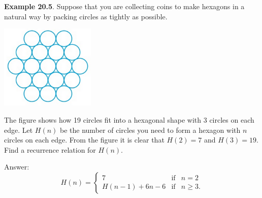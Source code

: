 \documentclass[aspectratio=169]{beamer}
\begin{document}
 
\begin{frame}[plain]{}

  {\bf Example 20.5}. 
  Suppose that you are collecting coins to make hexagons in a natural way
    by packing circles as tightly as possible.
    \begin{center}
     \includegraphics[height=4cm]{./img/lecture20-fig3.png}
    \end{center}
    The figure shows how 19 circles fit into a hexagonal shape with 3 circles
      on each edge. Let $H(n)$ be the number of circles you need to form a hexagon with
      $n$ circles on each edge. From the figure it is clear that $H(2)=7$
       and $H(3)=19$. Find a recurrence relation for $H(n)$.
       
\end{frame}

\begin{frame}[plain]{}

 Answer:
  \[ 
          H(n) = \left\{ \begin{array}{ccc}
                          7 &\mbox{if}& n=2\ \\
                          H(n-1) + 6n - 6&\mbox{if}& n\geq 3.
                         \end{array}
                  \right.             
     \]
 \end{frame}
\end{document}
